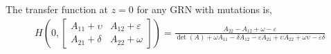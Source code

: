 \documentclass[11 pt]{article}
\newcommand{\pda}{\frac{\partial}{\partial A_{ij}}}
\newcommand{\ind}{\mathds{1}}
\begin{document}
%
%
 The transfer function at $z=0$ for any GRN with mutations is, 
  \begin{align*}
    H(0, \begin{bmatrix} A_{11} + \upsilon & A_{12} + \varepsilon \\ A_{21} + \delta & A_{22} + \omega \end{bmatrix}) = \frac{A_{22} - A_{12} + \omega - \varepsilon}{ \det(A) + \omega A_{11} - \delta A_{12} - \varepsilon A_{21} + \upsilon A_{22} + \omega \upsilon - \varepsilon \delta }
  \end{align*}

\end{document}
